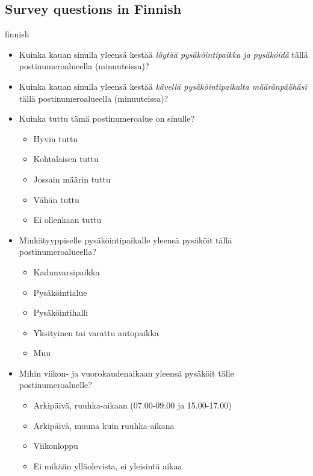 \subsection{Survey questions in Finnish}
\justify
\begin{otherlanguage*}{finnish}
\begin{spacing}{1}
    \begin{itemize}
        \item Kuinka kauan sinulla yleensä kestää \textit{löytää pysäköintipaikka ja pysäköidä} tällä postinumeroalueella (minuuteissa)?
        \item Kuinka kauan sinulla yleensä kestää \textit{kävellä pysäköintipaikalta määränpäähäsi} tällä postinumeroalueella (minuuteissa)?
        \item Kuinka tuttu tämä postinumeroalue on sinulle?
        \begin{itemize}
            \item Hyvin tuttu
            \item Kohtalaisen tuttu
            \item Jossain määrin tuttu
            \item Vähän tuttu
            \item Ei ollenkaan tuttu
        \end{itemize}
        \item Minkätyyppiselle pysäköintipaikalle yleensä pysäköit tällä postinumeroalueella?
        \begin{itemize}
            \item Kadunvarsipaikka
            \item Pysäköintialue
            \item Pysäköintihalli
            \item Yksityinen tai varattu autopaikka
            \item Muu
        \end{itemize}
        \item Mihin viikon- ja vuorokaudenaikaan yleensä pysäköit tälle postinumeroaluelle?
        \begin{itemize}
            \item Arkipäivä, ruuhka-aikaan (07.00-09.00 ja 15.00-17.00) 
            \item Arkipäivä, muuna kuin ruuhka-aikana
            \item Viikonloppu
            \item Ei mikään ylläolevista, ei yleisintä aikaa
        \end{itemize}
    \end{itemize}
\end{spacing}
\end{otherlanguage*}

